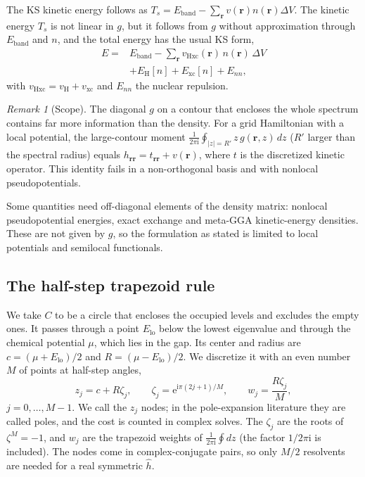 \documentclass[aps,prb,twocolumn,superscriptaddress,floatfix,longbibliography]{revtex4-2}
\theoremstyle{remark}
\newtheorem{remark}{Remark}
\newcommand{\ee}{\mathrm{e}}
\newcommand{\ii}{\mathrm{i}}
\begin{document}
The KS kinetic energy follows as $T_s=E_\mathrm{band}-\sum_{\bm r}v(\bm r)n(\bm r)\Delta V$. The kinetic energy $T_s$ is not linear in $g$, but it follows from $g$ without approximation through $E_\mathrm{band}$ and
$n$, and the total energy has the usual KS form,
\begin{align}
E={}&E_\mathrm{band}-\textstyle\sum_{\bm r}v_\mathrm{Hxc}(\bm r)\,n(\bm r)\,\Delta V\nonumber\\
&+E_\mathrm{H}[n]+E_\mathrm{xc}[n]+E_{nn},
\label{eq:energy}
\end{align}
with $v_\mathrm{Hxc}=v_\mathrm{H}+v_\mathrm{xc}$ and $E_{nn}$ the nuclear repulsion.

\begin{remark}[Scope]\label{rem:potential}
The diagonal $g$ on a contour that encloses the whole spectrum contains far more information than the density. For a grid
Hamiltonian with a local potential, the large-contour moment $\frac{1}{2\pi\ii}\oint_{|z|=R'}z\,g(\bm r,z)\,dz$ ($R'$ larger
than the spectral radius) equals $h_{\bm r\bm r}=t_{\bm r\bm r}+v(\bm r)$, where $t$ is the discretized kinetic operator.
This identity fails in a non-orthogonal basis and with nonlocal pseudopotentials.

Some quantities need off-diagonal elements of the density matrix: nonlocal pseudopotential energies, exact exchange and
meta-GGA kinetic-energy densities. These are not given by $g$, so the formulation as stated is limited to local potentials
and semilocal functionals.
\end{remark}

\subsection{The half-step trapezoid rule}\label{sec:rule}

We take $C$ to be a circle that encloses the occupied levels and excludes the empty ones. It passes through a point
$E_\mathrm{lo}$ below the lowest eigenvalue and through the chemical potential $\mu$, which lies in the gap. Its center and
radius are $c=(\mu+E_\mathrm{lo})/2$ and $R=(\mu-E_\mathrm{lo})/2$. We discretize it with an even number $M$ of points at
half-step angles,
\begin{equation}
z_j=c+R\zeta_j,\qquad \zeta_j=\ee^{\ii\pi(2j+1)/M},\qquad w_j=\frac{R\zeta_j}{M},
\label{eq:nodes}
\end{equation}
$j=0,\dots,M-1$. We call the $z_j$ nodes; in the pole-expansion literature they are called poles, and the cost is counted in
complex solves. The $\zeta_j$ are the roots of $\zeta^M=-1$, and $w_j$ are the trapezoid weights of
$\frac{1}{2\pi\ii}\oint dz$ (the factor $1/2\pi\ii$ is included). The nodes come in complex-conjugate pairs, so only
$M/2$ resolvents are needed for a real symmetric $\hat h$.
\end{document}
